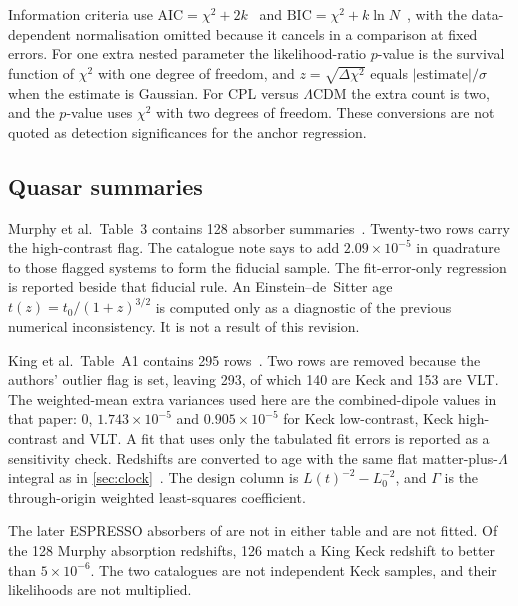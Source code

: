 Information criteria use $\mathrm{AIC}=\chi^{2}+2k$~\citep{Akaike1974} and $\mathrm{BIC}=\chi^{2}+k\ln N$~\citep{Schwarz1978}, with the data-dependent normalisation omitted because it cancels in a comparison at fixed errors.
For one extra nested parameter the likelihood-ratio $p$-value is the survival function of $\chi^{2}$ with one degree of freedom, and $z=\sqrt{\Delta\chi^{2}}$ equals $|\mathrm{estimate}|/\sigma$ when the estimate is Gaussian.
For CPL versus $\Lambda$CDM the extra count is two, and the $p$-value uses $\chi^{2}$ with two degrees of freedom.
These conversions are not quoted as detection significances for the anchor regression.

\subsection{Quasar summaries}
\label{sec:quasar-methods}

Murphy et al.\ Table~3 contains 128 absorber summaries~\citep{Murphy2003}.
Twenty-two rows carry the high-contrast flag.
The catalogue note says to add $2.09\times10^{-5}$ in quadrature to those flagged systems to form the fiducial sample.
The fit-error-only regression is reported beside that fiducial rule.
An Einstein--de~Sitter age $t(z)=t_{0}/(1+z)^{3/2}$ is computed only as a diagnostic of the previous numerical inconsistency.
It is not a result of this revision.

King et al.\ Table~A1 contains 295 rows~\citep{King2012}.
Two rows are removed because the authors' outlier flag is set, leaving 293, of which 140 are Keck and 153 are VLT.
The weighted-mean extra variances used here are the combined-dipole values in that paper: $0$, $1.743\times10^{-5}$ and $0.905\times10^{-5}$ for Keck low-contrast, Keck high-contrast and VLT.
A fit that uses only the tabulated fit errors is reported as a sensitivity check.
Redshifts are converted to age with the same flat matter-plus-$\Lambda$ integral as in \cref{sec:clock}~\citep{Dodelson2020}.
The design column is $L(t)^{-2}-L_{0}^{-2}$, and $\Gamma$ is the through-origin weighted least-squares coefficient.

The later ESPRESSO absorbers of \citep{Wilczynska2020} are not in either table and are not fitted.
Of the 128 Murphy absorption redshifts, 126 match a King Keck redshift to better than $5\times10^{-6}$.
The two catalogues are not independent Keck samples, and their likelihoods are not multiplied.
